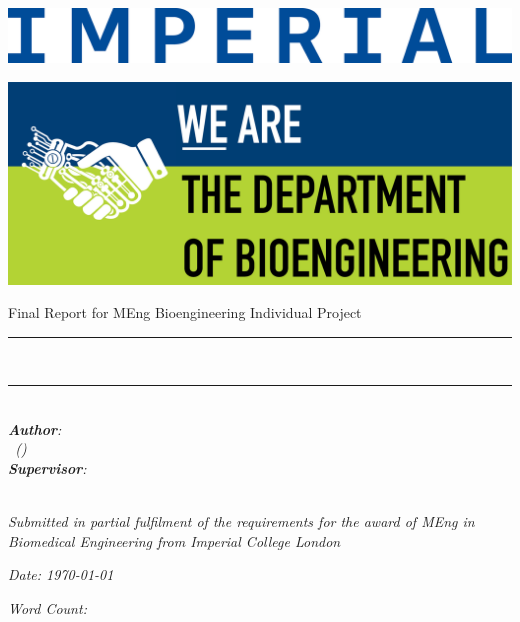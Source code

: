 \begin{titlepage}
\Large

\begin{minipage}{0.4\textwidth}
    \includegraphics[width=\textwidth]{figures/IMPERIAL_Wordmark_CMYK_Blue_2024.eps}
\end{minipage}
\hfill
\begin{minipage}{0.4\textwidth}
\begin{flushright}
    \includegraphics[width=.9\textwidth]{figures/Bioeng.png}
\end{flushright}
\end{minipage}

\vspace{1.5cm}

\begin{center}
    {\huge Final Report for MEng Bioengineering Individual Project} \\ [1cm]
    \rule{\textwidth}{.1cm} \\[0.4cm]
    {\Huge \textbf{\reporttitle}}
    \rule{\textwidth}{.1cm} \\ [1.5cm]

    \textit{\textbf{Author}: \\ \reportauthor \ (\cid)} \\ [1cm]
    \textit{\textbf{Supervisor}: \\ \reportsupervisor} \\ [1cm]

    \vspace{2cm}

    \textit{Submitted in partial fulfilment of the requirements for the award of MEng in Biomedical Engineering from Imperial College London}

    \vfill
    
    \begin{minipage}{0.5\textwidth}
    \centering
        \textit{Date: \today} \\ [1cm]
    \end{minipage}
    \hfill
    \begin{minipage}{0.4\textwidth}
    \centering
        \textit{Word Count: \wordcount} \\ [1cm]
    \end{minipage}
\end{center}

\end{titlepage}